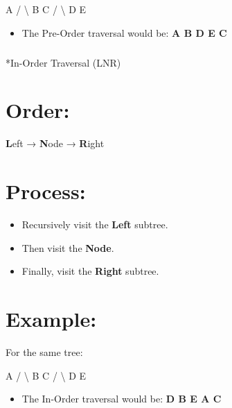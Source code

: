 \documentclass[
  letterpaper,
  DIV=11,
  numbers=noendperiod]{scrreprt}
\makeatletter
\let\oldsubparagraph\subparagraph
\renewcommand{\subparagraph}{
    \@ifstar
      \xxxSubParagraphStar
      \xxxSubParagraphNoStar
  }
\newcommand{\xxxSubParagraphStar}[1]{\oldsubparagraph*{#1}\mbox{}}
\newcommand{\xxxSubParagraphNoStar}[1]{\oldsubparagraph{#1}\mbox{}}
\newenvironment{Shaded}{\begin{snugshade}}{\end{snugshade}}
\newcommand{\NormalTok}[1]{\textcolor[rgb]{0.00,0.23,0.31}{#1}}
\providecommand{\tightlist}{%
  \setlength{\itemsep}{0pt}\setlength{\parskip}{0pt}}
\makeatother
\begin{document}
\begin{Shaded}
\begin{Highlighting}[]
\NormalTok{    A}
\NormalTok{   / \textbackslash{}}
\NormalTok{  B   C}
\NormalTok{ / \textbackslash{}}
\NormalTok{D   E}
\end{Highlighting}
\end{Shaded}

\begin{itemize}
\tightlist
\item
  The Pre-Order traversal would be: \textbf{A B D E C}
\end{itemize}

\subparagraph*{In-Order Traversal (LNR)}\label{in-order-traversal-lnr}

\section{Order:}

\textbf{L}eft → \textbf{N}ode → \textbf{R}ight

\section{Process:}

\begin{itemize}
\tightlist
\item
  Recursively visit the \textbf{Left} subtree.
\item
  Then visit the \textbf{Node}.
\item
  Finally, visit the \textbf{Right} subtree.
\end{itemize}

\section{Example:}

For the same tree:

\begin{Shaded}
\begin{Highlighting}[]
\NormalTok{    A}
\NormalTok{   / \textbackslash{}}
\NormalTok{  B   C}
\NormalTok{ / \textbackslash{}}
\NormalTok{D   E}
\end{Highlighting}
\end{Shaded}

\begin{itemize}
\tightlist
\item
  The In-Order traversal would be: \textbf{D B E A C}
\end{itemize}
\end{document}
